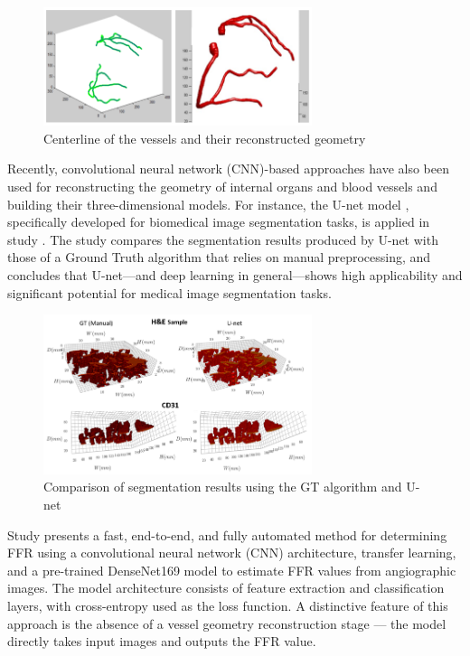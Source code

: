 \documentclass[default]{subfiles}
\begin{document}
\begin{figure}[H]
  \centering
  \includegraphics[width=0.7\textwidth]{image/pic2.png}
  \caption{Centerline of the vessels and their reconstructed geometry \cite{lu2020vessels}}
\end{figure}

Recently, convolutional neural network (CNN)-based approaches have also been used for reconstructing the geometry of
internal organs and blood vessels and building their three-dimensional models. For instance, the U-net model
\cite{ronneberger2015unet}, specifically developed for biomedical image segmentation tasks, is applied in study
\cite{ramakrishnan2023vessels}. The study compares the segmentation results produced by U-net with those of a Ground
Truth algorithm that relies on manual preprocessing, and concludes that U-net—and deep learning in general—shows high
applicability and significant potential for medical image segmentation tasks.

\begin{figure}[H]
    \centering
    \includegraphics[width=0.7\textwidth]{image/pic3.png}
    \caption{Comparison of segmentation results using the GT algorithm and U-net \cite{ramakrishnan2023vessels}}
\end{figure}

Study \cite{arefinia2024deepffr} presents a fast, end-to-end, and fully automated method for determining FFR using a
convolutional neural network (CNN) architecture, transfer learning, and a pre-trained DenseNet169 model to estimate FFR
values from angiographic images. The model architecture consists of feature extraction and classification layers, with
cross-entropy used as the loss function. A distinctive feature of this approach is the absence of a vessel geometry
reconstruction stage — the model directly takes input images and outputs the FFR value.
\end{document}
